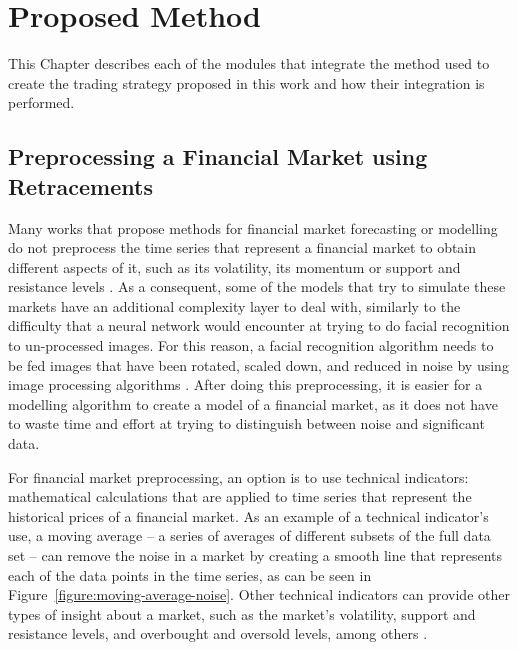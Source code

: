 \chapter{Proposed Method}
\label{chapter:proposed-method}

This Chapter describes each of the modules that integrate the method used to
create the trading strategy proposed in this work and how their integration is
performed.

\section{Preprocessing a Financial Market using Retracements}
\label{section:preprocessing-a-financial-market-using-retracements}

Many works that propose methods for financial market forecasting or modelling do
not preprocess the time series that represent a financial market to obtain
different aspects of it, such as its volatility, its momentum or support and
resistance levels \cite{Elliott2016}. As a consequent, some of the models that
try to simulate these markets have an additional complexity layer to deal with,
similarly to the difficulty that a neural network would encounter at trying to
do facial recognition to un-processed images. For this reason, a facial
recognition algorithm needs to be fed images that have been rotated, scaled
down, and reduced in noise by using image processing algorithms
\cite{Bieniecki2007} \cite{Heseltine2003}. After doing this preprocessing, it is
easier for a modelling algorithm to create a model of a financial market, as it
does not have to waste time and effort at trying to distinguish between noise
and significant data.

For financial market preprocessing, an option is to use technical indicators:
mathematical calculations that are applied to time series that represent the
historical prices of a financial market. As an example of a technical
indicator's use, a moving average -- a series of averages of different subsets
of the full data set -- can remove the noise in a market by creating a smooth
line that represents each of the data points in the time series, as can be seen
in Figure~\ref{figure:moving-average-noise}. Other technical indicators can
provide other types of insight about a market, such as the market's volatility,
support and resistance levels, and overbought and oversold levels, among others
\cite{Vora2011}.


